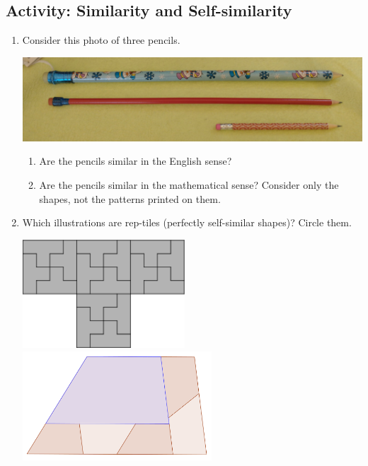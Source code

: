\subsection{Activity: Similarity and Self-similarity}
\begin{enumerate}
\item Consider this photo of three pencils.
\begin{center}
\includegraphics[width=5in]{images/similarPencils}
\par\end{center}
\begin{enumerate}
\item Are the pencils similar in the English sense?
\item Are the pencils similar in the mathematical sense? Consider only the
shapes, not the patterns printed on them.
\end{enumerate}
\item Which illustrations are rep-tiles (perfectly self-similar shapes)? Circle them.
\begin{center}
    \includegraphics[height=1.6in]{images/rep-tile-72} \hfill
    \includegraphics[height=1.6in]{images/T23} \hfill\par\vfill

\end{center}
\end{enumerate}
